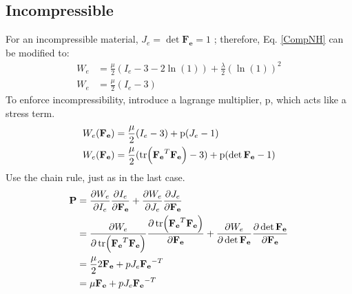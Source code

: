 \documentclass[12pt,3p]{article}
\numberwithin{equation}{section}
\begin{document}
\subsection{Incompressible}
For an incompressible material, $J_e = \det \mathbf{F_e} = 1$ ; therefore, Eq. \ref{CompNH} can be modified to: 
\begin{align*}
W_e &= \frac{\mu}{2} (I_e - 3 - 2 \ln (1)) + \frac{\lambda}{2} (\ln (1))^2 \\
W_e &= \frac{\mu}{2} (I_e - 3) 
\end{align*}
To enforce incompressibility, introduce a lagrange multiplier, p, which acts like a stress term. 
\begin{align}\label{EnergyDensity}
\begin{split}
W_e(\mathbf{F_e}) &= \frac{\mu}{2} (I_e - 3) + \text{p} (J_e -1) \\
W_e(\mathbf{F_e}) &= \frac{\mu}{2} (\tr (\mathbf{F_e}^T \mathbf{F_e}) - 3) + \text{p} (\det \mathbf{F_e} -1)
\end{split}
\end{align}
Use the chain rule, just as in the last case. 
\begin{align*}
\mathbf{P} &= \pdv{W_e}{I_e} \pdv{I_e}{\mathbf{F_e}} + \pdv{W_e}{J_e} \pdv{J_e}{\mathbf{F_e}} \\
		&= \pdv{W_e}{\tr (\mathbf{F_e}^T \mathbf{F_e})} \pdv{\tr (\mathbf{F_e}^T \mathbf{F_e})}{\mathbf{F_e}} + \pdv{W_e}{\det \mathbf{F_e}} \pdv{\det \mathbf{F_e}}{\mathbf{F_e}} \\
		&= \frac{\mu}{2} 2 \mathbf{F_e} + p J_e \mathbf{F_e}^{-T} \\
		&= \mu \mathbf{F_e} + p J_e \mathbf{F_e}^{-T}
\end{align*}

\end{document}

